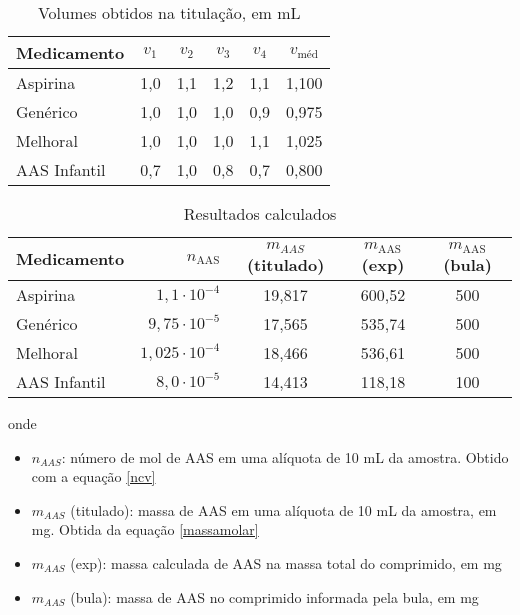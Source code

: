 \begin{table}[H]\label{titulacao_exp1}
    \centering
    \begin{tabular}{l c c c c c}

        \toprule
        Medicamento & $v_1$  & $v_2$ & $v_3$ & $v_4$ & $v_{\textrm{méd}}$ \\
        \midrule
        Aspirina\R     & 1,0 & 1,1 & 1,2 & 1,1 & 1,100 \\
        Genérico     & 1,0 & 1,0 & 1,0 & 0,9 & 0,975  \\
        Melhoral     & 1,0 & 1,0 & 1,0 & 1,1 & 1,025\\
        AAS Infantil & 0,7 & 1,0 & 0,8 & 0,7 & 0,800\\
       \bottomrule

    \end{tabular}
    \caption{Volumes obtidos na titulação, em mL}
\end{table}

\begin{table}[H]\label{res_calculados_exp1}
    \centering
    \begin{tabular}{l r c c c }
        \toprule
        Medicamento & $n_{\textrm{AAS}}$ &$m_{AAS}$(titulado)& 
        $m_{\textrm{AAS}}$(exp) & $m_{\textrm{AAS}}$ (bula) \\

        \midrule
        Aspirina\R     & $1,1\cdot 10^{-4}$   &19,817 & 600,52 & 500\\
        Genérico     & $9,75\cdot 10^{-5}$  & 17,565 & 535,74 & 500 \\
        Melhoral     & $1,025\cdot 10^{-4}$ & 18,466 & 536,61 & 500 \\
        AAS Infantil & $8,0\cdot 10^{-5}$   & 14,413 & 118,18 & 100 \\
        \bottomrule
    \end{tabular}
    \caption{Resultados calculados}
\end{table}

onde
\begin{itemize}
    \item[] $n_{AAS}$: número de mol de AAS em uma alíquota  de 10 mL da amostra. Obtido
        com a equação \eqref{ncv}
    \item[] $m_{AAS}$ (titulado): massa de AAS em uma alíquota de 10 mL da amostra, em mg.
        Obtida da equação \eqref{massamolar}
    \item[]$m_{AAS}$ (exp): massa calculada de AAS na massa total do comprimido, em mg
    \item[] $m_{AAS}$ (bula): massa de AAS no comprimido informada pela bula, em mg
\end{itemize}


